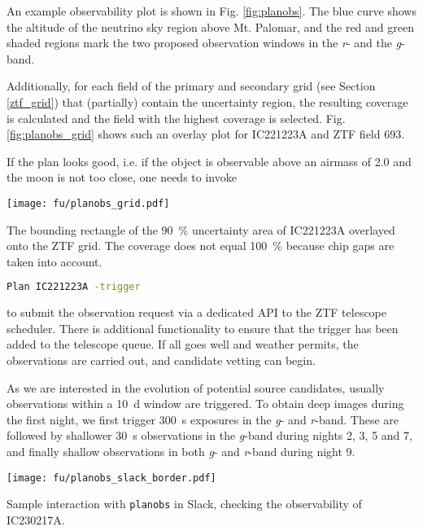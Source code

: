 An example observability plot is shown in Fig. \ref{fig:planobs}. The blue curve shows the altitude of the neutrino sky region above Mt. Palomar, and the red and green shaded regions mark the two proposed observation windows in the \textit{r}- and the \textit{g}-band.

Additionally, for each field of the primary and secondary grid (see Section \ref{ztf_grid}) that (partially) contain the uncertainty region, the resulting coverage is calculated and the field with the highest coverage is selected. Fig. \ref{fig:planobs_grid} shows such an overlay plot for IC221223A and ZTF field 693.

If the plan looks good, i.e. if the object is observable above an airmass of 2.0 and the moon is not too close, one needs to invoke
\begin{marginfigure}
    \texttt{[image: fu/planobs\_grid.pdf]}
    \caption[\texttt{planobs} ZTF grid]{The bounding rectangle of the \SI{90}{\percent} uncertainty area of IC221223A overlayed onto the ZTF grid. The coverage does not equal \SI{100}{\percent} because chip gaps are taken into account.}
\end{marginfigure}
\begin{lstlisting}[language=bash,style=kaolstplain]
Plan IC221223A -trigger
\end{lstlisting}

to submit the observation request via a dedicated API to the ZTF telescope scheduler. There is additional functionality to ensure that the trigger has been added to the telescope queue. If all goes well and weather permits, the observations are carried out, and candidate vetting can begin.

As we are interested in the evolution of potential source candidates, usually observations within a \SI{10}{\day} window are triggered. To obtain deep images during the first night, we first trigger \SI{300}{\second} exposures in the \textit{g}- and \textit{r}-band. These are followed by shallower \SI{30}{\second} observations in the \textit{g}-band during nights 2, 3, 5 and 7, and finally shallow observations in both \textit{g}- and \textit{r}-band during night 9.
\begin{marginfigure}
    \texttt{[image: fu/planobs\_slack\_border.pdf]}
    \caption[\texttt{planobs} Slack interaction]{Sample interaction with \texttt{planobs} in Slack, checking the observability of IC230217A.}
\end{marginfigure} 
